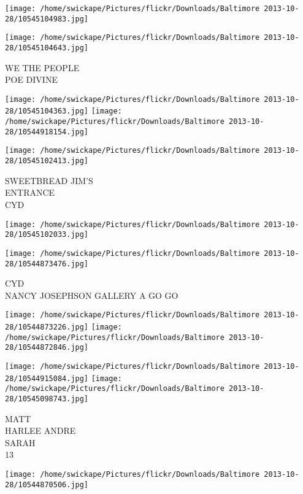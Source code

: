 \documentclass[10pt,letterpaper]{article}
\begin{document}
\texttt{[image: /home/swickape/Pictures/flickr/Downloads/Baltimore 2013-10-28/10545104983.jpg]}

\vspace{0.25in}
\texttt{[image: /home/swickape/Pictures/flickr/Downloads/Baltimore 2013-10-28/10545104643.jpg]}

WE THE PEOPLE\\
POE DIVINE\\
\pagebreak

\texttt{[image: /home/swickape/Pictures/flickr/Downloads/Baltimore 2013-10-28/10545104363.jpg]}
\texttt{[image: /home/swickape/Pictures/flickr/Downloads/Baltimore 2013-10-28/10544918154.jpg]}

\texttt{[image: /home/swickape/Pictures/flickr/Downloads/Baltimore 2013-10-28/10545102413.jpg]}

SWEETBREAD JIM'S\\
ENTRANCE\\
CYD\\
\pagebreak

\texttt{[image: /home/swickape/Pictures/flickr/Downloads/Baltimore 2013-10-28/10545102033.jpg]}

\vspace{0.25in}
\texttt{[image: /home/swickape/Pictures/flickr/Downloads/Baltimore 2013-10-28/10544873476.jpg]}

CYD\\
NANCY JOSEPHSON GALLERY A GO GO\\
\pagebreak

\texttt{[image: /home/swickape/Pictures/flickr/Downloads/Baltimore 2013-10-28/10544873226.jpg]}
\texttt{[image: /home/swickape/Pictures/flickr/Downloads/Baltimore 2013-10-28/10544872846.jpg]}

\texttt{[image: /home/swickape/Pictures/flickr/Downloads/Baltimore 2013-10-28/10544915084.jpg]}
\texttt{[image: /home/swickape/Pictures/flickr/Downloads/Baltimore 2013-10-28/10545098743.jpg]}

MATT\\
HARLEE ANDRE\\
SARAH\\
13\\
\pagebreak

\texttt{[image: /home/swickape/Pictures/flickr/Downloads/Baltimore 2013-10-28/10544870506.jpg]}
\end{document}
